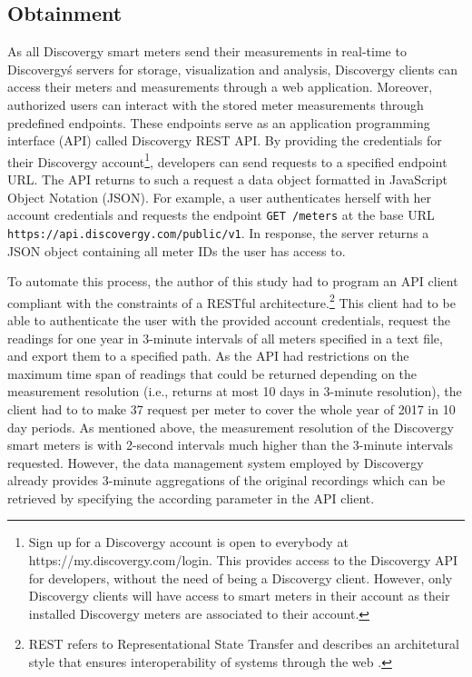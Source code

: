 
\subsection{Obtainment}\label{Sec:Data;Subsec:Obtainment}

As all Discovergy smart meters send their measurements in real-time to Discovergy\'s servers for storage, visualization and analysis, Discovergy clients can access their meters and measurements through a web application. Moreover, authorized users can interact with the stored meter measurements through predefined endpoints. These endpoints serve as an application programming interface (API) called Discovergy REST API. By providing the credentials for their Discovergy account\footnote{Sign up for a Discovergy account is open to everybody at https://my.discovergy.com/login. This provides access to the Discovergy API for developers, without the need of being a Discovergy client. However, only Discovergy clients will have access to smart meters in their account as their installed Discovergy meters are associated to their account.}, developers can send requests to a specified endpoint URL. The API returns to such a request a data object formatted in JavaScript Object Notation (JSON). For example, a user authenticates herself with her account credentials and requests the endpoint \texttt{GET /meters} at the base URL \texttt{https://api.discovergy.com/public/v1}. In response, the server returns a JSON object containing all meter IDs the user has access to.

To automate this process, the author of this study had to program an API client compliant with the constraints of a RESTful architecture.\footnote{REST refers to Representational State Transfer and describes an architetural style that ensures interoperability of systems through the web \citep[see][]{fielding:2000}.} This client  had to be able to authenticate the user with the provided account credentials, request the readings for one year in 3-minute intervals of all meters specified in a text file, and export them to a specified path. As the API had restrictions on the maximum time span of readings that could be returned depending on the measurement resolution (i.e., returns at most 10 days in 3-minute resolution), the client had to to make 37 request per meter to cover the whole year of 2017 in 10 day periods. As mentioned above, the measurement resolution of the Discovergy smart meters is with 2-second intervals much higher than the 3-minute intervals requested. However, the data management system employed by Discovergy already provides 3-minute aggregations of the original recordings which can be retrieved by specifying the according parameter in the API client.

